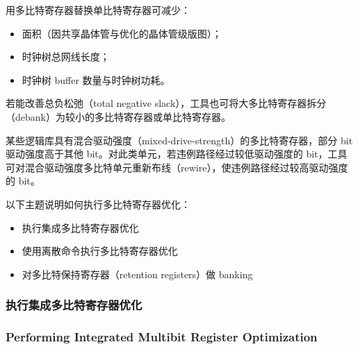 用多比特寄存器替换单比特寄存器可减少：
\begin{itemize}
  \item 面积（因共享晶体管与优化的晶体管级版图）；
  \item 时钟树总网线长度；
  \item 时钟树 buffer 数量与时钟树功耗。
\end{itemize}

若能改善总负松弛（total negative slack），工具也可将大多比特寄存器拆分（debank）为较小的多比特寄存器或单比特寄存器。

某些逻辑库具有混合驱动强度（mixed-drive-strength）的多比特寄存器，部分 bit 驱动强度高于其他 bit。对此类单元，若违例路径经过较低驱动强度的 bit，工具可对混合驱动强度多比特单元重新布线（rewire），使违例路径经过较高驱动强度的 bit。

以下主题说明如何执行多比特寄存器优化：
\begin{itemize}
  \item 执行集成多比特寄存器优化
  \item 使用离散命令执行多比特寄存器优化
  \item 对多比特保持寄存器（retention registers）做 banking
\end{itemize}

\subsubsection{执行集成多比特寄存器优化}
\subsubsection*{Performing Integrated Multibit Register Optimization}

